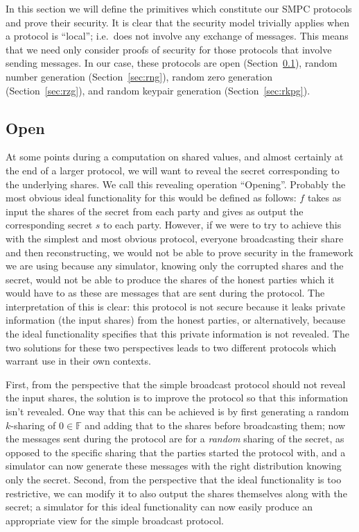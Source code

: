 \documentclass{article}
\theoremstyle{remark}
\newcommand{\F}{\mathbb{F}}
\begin{document}
In this section we will define the primitives which constitute our SMPC
protocols and prove their security. It is clear that the security model
trivially applies when a protocol is ``local''; i.e.\ does not involve any
exchange of messages. This means that we need only consider proofs of security
for those protocols that involve sending messages. In our case, these protocols
are open (Section~\ref{sec:open}), random number generation
(Section~\ref{sec:rng}), random zero generation (Section~\ref{sec:rzg}), and
random keypair generation (Section~\ref{sec:rkpg}).

\subsection{Open}\label{sec:open}

At some points during a computation on shared values, and almost certainly at
the end of a larger protocol, we will want to reveal the secret corresponding
to the underlying shares. We call this revealing operation ``Opening''.
Probably the most obvious ideal functionality for this would be defined as
follows: $f$ takes as input the shares of the secret from each party and gives
as output the corresponding secret $s$ to each party. However, if we were to
try to achieve this with the simplest and most obvious protocol, everyone
broadcasting their share and then reconstructing, we would not be able to prove
security in the framework we are using because any simulator, knowing only the
corrupted shares and the secret, would not be able to produce the shares of the
honest parties which it would have to as these are messages that are sent
during the protocol. The interpretation of this is clear: this protocol is not
secure because it leaks private information (the input shares) from the honest
parties, or alternatively, because the ideal functionality specifies that this
private information is not revealed. The two solutions for these two
perspectives leads to two different protocols which warrant use in their own
contexts.

First, from the perspective that the simple broadcast protocol should not
reveal the input shares, the solution is to improve the protocol so that this
information isn't revealed. One way that this can be achieved is by first
generating a random $k$-sharing of $0 \in \F$ and adding that to the shares
before broadcasting them; now the messages sent during the protocol are for a
\textit{random} sharing of the secret, as opposed to the specific sharing that
the parties started the protocol with, and a simulator can now generate these
messages with the right distribution knowing only the secret. Second, from the
perspective that the ideal functionality is too restrictive, we can modify it
to also output the shares themselves along with the secret; a simulator for
this ideal functionality can now easily produce an appropriate view for the
simple broadcast protocol.
\end{document}
